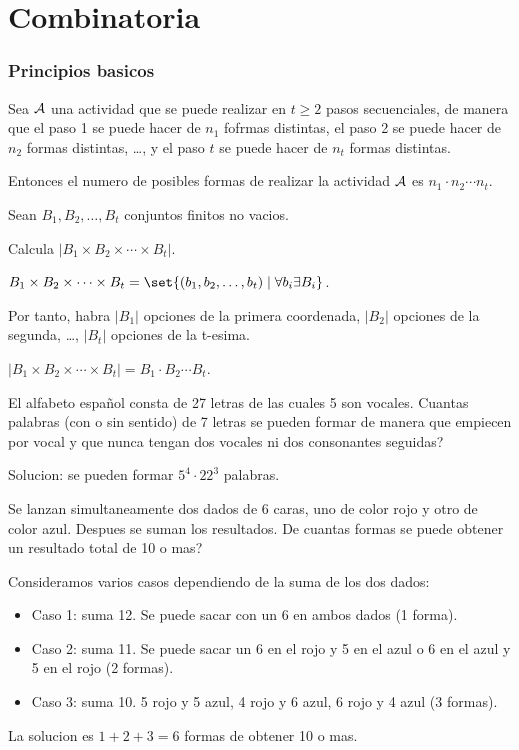 \part{Combinatoria}
\section{Principios basicos}
\begin{proposition}
	Sea \(\mathcal{\MakeUppercase{a}}\) una actividad que se puede realizar en \(t \geq  2 \) pasos secuenciales, de manera que el paso 1 se puede hacer de \(n_1 \) fofrmas distintas, el paso 2 se puede hacer de \(n_2 \) formas distintas, \dots, y el paso \(t \) se puede hacer de \(n_t \) formas distintas.

	Entonces el numero de posibles formas de realizar la actividad \(\mathcal{\MakeUppercase{a}} \) es \(n_1 \cdot n_2 \cdots n_t\).
\end{proposition}

\begin{example}
	Sean \(B_1, B_2, \ldots, B_t \) conjuntos finitos no vacios.

	Calcula \(|B_1 \times B_2 \times \cdots \times B_t|\).

	\(B_1 \times B_2 \times \cdots \times B_t = \set{(b_1, b_2, \ldots, b_t) \mid \forall b_i \exists B_i}\).

	Por tanto, habra \(|B_1| \) opciones de la primera coordenada, \(|B_2| \) opciones de la segunda, \dots, \(|B_t| \) opciones de la t-esima.

	\(|B_1 \times B_2 \times \cdots \times B_t| = B_1 \cdot B_2 \cdots B_t\).
\end{example}

\begin{example}
	El alfabeto español consta de 27 letras de las cuales 5 son vocales. Cuantas palabras (con o sin sentido) de 7 letras se pueden formar de manera que empiecen por vocal y que nunca tengan dos vocales ni dos consonantes seguidas?

	Solucion: se pueden formar \(5^{4} \cdot 22^{3}\) palabras.
\end{example}

\begin{example}
	Se lanzan simultaneamente dos dados de 6 caras, uno de color rojo y otro de color azul. Despues se suman los resultados. De cuantas formas se puede obtener un resultado total de 10 o mas?

	Consideramos varios casos dependiendo de la suma de los dos dados:
	\begin{itemize}
		\item Caso 1: suma 12. Se puede sacar con un 6 en ambos dados (1 forma).
		\item Caso 2: suma 11. Se puede sacar un 6 en el rojo y 5 en el azul o 6 en el azul y 5 en el rojo (2 formas).
		\item Caso 3: suma 10. 5 rojo y 5 azul, 4 rojo y 6 azul, 6 rojo y 4 azul (3 formas).
	\end{itemize}

	La solucion es \(1 + 2 + 3 = 6 \) formas de obtener 10 o mas.
\end{example}

